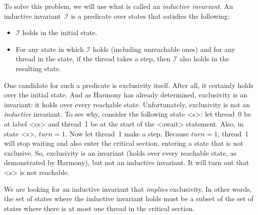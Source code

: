 \documentclass{report}
\begin{document}
To solve this problem, we will use what is called an
\emph{inductive invariant}.
%
An inductive invariant~$\mathcal{I}$ is a predicate over states that satisfies the following:
\begin{itemize}
\item $\mathcal{I}$ holds in the initial state.
\item For any state in which $\mathcal{I}$ holds (including unreachable ones) and for any
thread in the state, if the thread takes a step, then $\mathcal{I}$ also holds in the
resulting state.
\end{itemize}

One candidate for such a predicate is exclusivity itself.
After all, it certainly holds over the initial state.
And as Harmony has already determined, exclusivity is an invariant:
it holds over every reachable state.
Unfortunately, exclusivity is not an \emph{inductive} invariant.
To see why, consider the following state <{s}>: let thread~0 be at label <{cs}>
and thread~1 be at the start of the <{await}> statement.
Also, in state <{s}>, $\mathit{turn} = 1$.  Now let
thread~1 make a step.  Because $\mathit{turn} = 1$,
thread~1 will stop waiting and also enter the critical
section, entering a state that is not exclusive.
So, exclusivity is an invariant (holds over every reachable state, as demonstrated
by Harmony),
but not an inductive invariant.
It will turn out that <{s}> is not reachable.

We are looking for an inductive invariant that \emph{implies} exclusivity.
In other words, the set of states where the inductive invariant holds
must be a subset of the set of states where there is at most one thread in
the critical section.
\end{document}
